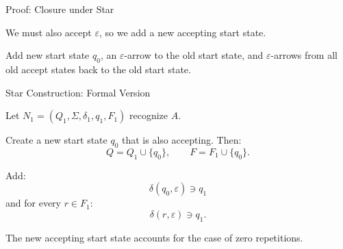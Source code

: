 \documentclass[10pt,aspectratio=169]{beamer}
\newcommand{\eps}{\varepsilon}
\begin{document}
\begin{frame}{Proof: Closure under Star}

We must also accept $\eps$, so we add a new accepting start state.

\begin{center}
\end{center}

\vspace{0.3em}
Add new start state $q_0$, an $\eps$-arrow to the old start state, and $\eps$-arrows from all old accept states back to the old start state.

\end{frame}


\begin{frame}{Star Construction: Formal Version}

Let $N_1=(Q_1,\Sigma,\delta_1,q_1,F_1)$ recognize $A$.

\vspace{0.8em}
Create a new start state $q_0$ that is also accepting. Then:
\[
Q = Q_1 \cup \{q_0\}, \qquad F = F_1 \cup \{q_0\}.
\]

\vspace{0.8em}
Add:
\[
\delta(q_0,\eps) \ni q_1
\]
and for every $r\in F_1$:
\[
\delta(r,\eps) \ni q_1.
\]

\vspace{0.8em}
The new accepting start state accounts for the case of zero repetitions.

\end{frame}
\end{document}
